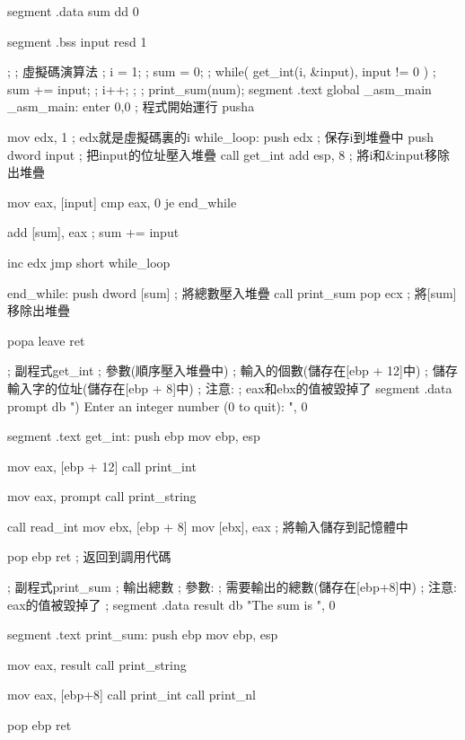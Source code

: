 \begin{AsmCodeListing}[label=sub3.asm]

segment .data
sum     dd   0

segment .bss
input   resd 1

;
; 虛擬碼演算法
; i = 1;
; sum = 0;
; while( get_int(i, &input), input != 0 ) {
;   sum += input;
;   i++;
; }
; print_sum(num);
segment .text
        global  _asm_main
_asm_main:
        enter   0,0               ; 程式開始運行
        pusha

        mov     edx, 1            ; edx就是虛擬碼裏的i
while_loop:
        push    edx               ; 保存i到堆疊中
        push    dword input       ; 把input的位址壓入堆疊
        call    get_int
        add     esp, 8            ; 將i和&input移除出堆疊

        mov     eax, [input]
        cmp     eax, 0
        je      end_while

        add     [sum], eax        ; sum += input

        inc     edx
        jmp     short while_loop

end_while:
        push    dword [sum]       ; 將總數壓入堆疊
        call    print_sum
        pop     ecx               ; 將[sum]移除出堆疊

        popa
        leave
        ret

; 副程式get_int
; 參數(順序壓入堆疊中)
;   輸入的個數(儲存在[ebp + 12]中)
;   儲存輸入字的位址(儲存在[ebp + 8]中)
; 注意:
;   eax和ebx的值被毀掉了
segment .data
prompt  db      ") Enter an integer number (0 to quit): ", 0

segment .text
get_int:
        push    ebp
        mov     ebp, esp

        mov     eax, [ebp + 12]
        call    print_int

        mov     eax, prompt
        call    print_string

        call    read_int
        mov     ebx, [ebp + 8]
        mov     [ebx], eax         ; 將輸入儲存到記憶體中

        pop     ebp
        ret                        ; 返回到調用代碼

; 副程式print_sum
; 輸出總數
; 參數:
;   需要輸出的總數(儲存在[ebp+8]中)
; 注意: eax的值被毀掉了
;
segment .data
result  db      "The sum is ", 0

segment .text
print_sum:
        push    ebp
        mov     ebp, esp

        mov     eax, result
        call    print_string

        mov     eax, [ebp+8]
        call    print_int
        call    print_nl

        pop     ebp
        ret
\end{AsmCodeListing}



